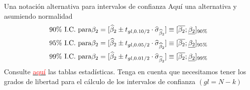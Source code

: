 \begin{frame}{Una notación alternativa para intervalos de confianza}
	Aquí una alternativa y asumiendo normalidad
		\begin{align*}
			& 90\% \textup{ I.C. para} \beta_2 =[\widehat{\beta}_2 \pm t_{gl, 0.10/2} \cdot \widehat{\sigma}_{\widehat{\beta}_2}] \equiv [\overline{\beta_2}; \underline{\beta_2}]_{90\%}\\
			& 95\% \textup{ I.C. para} \beta_2 =[\widehat{\beta}_2 \pm t_{gl, 0.05/2} \cdot \widehat{\sigma}_{\widehat{\beta}_2}] \equiv [\overline{\beta_2}; \underline{\beta_2}]_{95\%}\\
			& 99\% \textup{ I.C. para} \beta_2 =[\widehat{\beta}_2 \pm t_{gl, 0.01/2} \cdot \widehat{\sigma}_{\widehat{\beta}_2}] \equiv [\overline{\beta_2}; \underline{\beta_2}]_{99\%}
		\end{align*}
	Consulte \href{http://verso.mat.uam.es/~pablo.fernandez/tablas_ProbI_2007-2008.pdf}{\textcolor{red}{aquí}} las tablas estadísticas. Tenga en cuenta que necesitamos tener los grados de libertad para el cálculo de los intervalos de confianza $(gl = N - k)$
\end{frame}